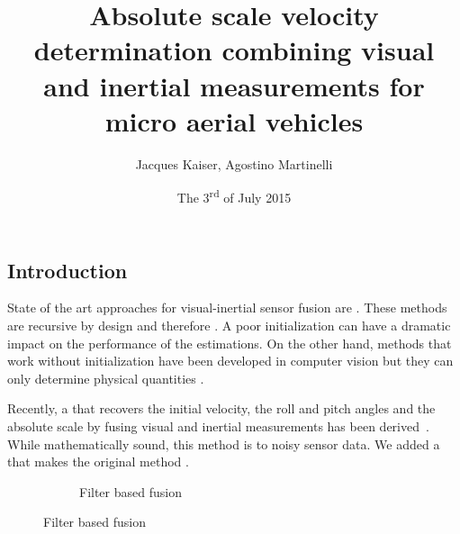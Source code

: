 \documentclass[final]{beamer}
\title
[ARSO, 1 - 3 July 2015, Lyon, France] %
{ %
Absolute scale velocity determination combining visual and inertial measurements for micro aerial vehicles
}
\author{ %
Jacques Kaiser, Agostino Martinelli
}
\institute
[INRIA] %
{
  Team Chroma, INRIA
}
\date{The 3\textsuperscript{rd} of July 2015}
\begin{document}
\begin{frame}[t]
\begin{multicols}{3}

\section{Introduction}

State of the art approaches for visual-inertial sensor fusion are .
These methods are recursive by design and therefore .
A poor initialization can have a
dramatic impact on the performance of the estimations.
On the other hand, methods that work without initialization have been developed in computer vision but
they can only determine physical quantities .

Recently, a  that recovers the initial velocity, the roll and pitch angles and the absolute scale by fusing visual and inertial measurements has been derived~\cite{Martinelli2014,Martinelli2012}.
While mathematically sound, this method is  to noisy sensor data.
We added a  that makes the original method .



\begin{figure}
  \centering
  \begin{subfigure}[t]{0.3\columnwidth}
    \caption{Filter based fusion}
    \hspace*{-2em}
\end{subfigure}
\end{figure}
\end{multicols}
\end{frame}
\end{document}
